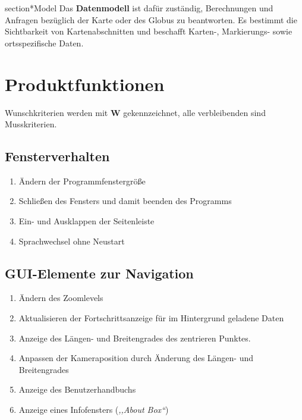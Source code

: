 \documentclass[10pt]{scrreprt}
\newcommand{\sfbf}[1]{\textbf{\sffamily #1}}
\newcommand{\W}{\sfbf{W}}
\newcommand{\ziel}[1]{{\fontsize{9.5}{11}\textsf{/#1/}}}
\newcommand{\ziellabel}{Z}
\newcommand{\muss}{\renewcommand{\labelenumi}{\textbf{\ziel{\ziellabel\numprint{\theenumi}0}}}}
\begin{document}
section*{Model}
Das \textbf{Datenmodell} ist dafür zuständig, Berechnungen und Anfragen bezüglich der Karte oder des Globus zu beantworten. Es bestimmt die Sichtbarkeit von Kartenabschnitten und beschafft Karten-, Markierungs- sowie ortsspezifische Daten.


\chapter{Produktfunktionen}

\muss
\renewcommand{\ziellabel}{F}

Wunschkriterien werden mit {\W } gekennzeichnet, alle verbleibenden sind Musskriterien.

\section{Fensterverhalten}
\begin{enumerate}[leftmargin=2.2cm]
\item Ändern der Programmfenstergröße 
\item Schließen des Fensters und damit beenden des Programms
\item Ein- und Ausklappen der Seitenleiste
\item Sprachwechsel ohne Neustart
\end{enumerate}

\section{GUI-Elemente zur Navigation}
\begin{enumerate}[leftmargin=2.2cm,resume]
\item Ändern des Zoomlevels
\item Aktualisieren der Fortschrittsanzeige für im Hintergrund geladene Daten
\item Anzeige des Längen- und Breitengrades des zentrieren Punktes.
\item Anpassen der Kameraposition durch Änderung des Längen- und Breitengrades
\item Anzeige des Benutzerhandbuchs
\item Anzeige eines Infofensters (\textit{,,About Box``})
\end{enumerate}
\end{document}
